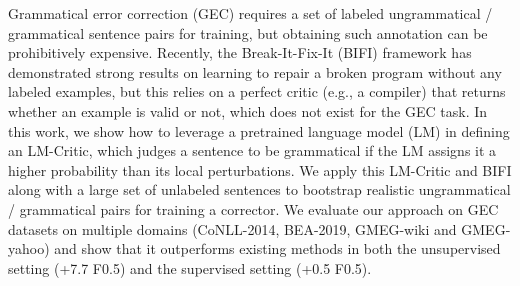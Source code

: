 Grammatical error correction (GEC) requires a set of labeled ungrammatical / grammatical sentence pairs for training, but obtaining such annotation can be prohibitively expensive. Recently, the Break-It-Fix-It (BIFI) framework has demonstrated strong results on learning to repair a broken program without any labeled examples, but this relies on a perfect critic (e.g., a compiler) that returns whether an example is valid or not, which does not exist for the GEC task. In this work, we show how to leverage a pretrained language model (LM) in defining an LM-Critic, which judges a sentence to be grammatical if the LM assigns it a higher probability than its local perturbations. We apply this LM-Critic and BIFI along with a large set of unlabeled sentences to bootstrap realistic ungrammatical / grammatical pairs for training a corrector. We evaluate our approach on GEC datasets on multiple domains (CoNLL-2014, BEA-2019, GMEG-wiki and GMEG-yahoo) and show that it outperforms existing methods in both the unsupervised setting (+7.7 F0.5) and the supervised setting (+0.5 F0.5).
